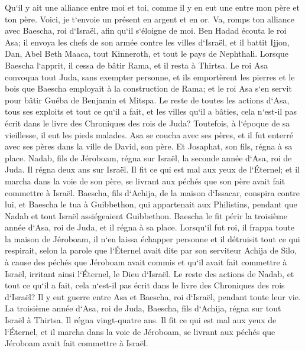 \verse Qu`il y ait une alliance entre moi et toi, comme il y en eut une entre mon père et ton père. Voici, je t`envoie un présent en argent et en or. Va, romps ton alliance avec Baescha, roi d`Israël, afin qu`il s`éloigne de moi. 
\verse Ben Hadad écouta le roi Asa; il envoya les chefs de son armée contre les villes d`Israël, et il battit Ijjon, Dan, Abel Beth Maaca, tout Kinneroth, et tout le pays de Nephthali. 
\verse Lorsque Baescha l`apprit, il cessa de bâtir Rama, et il resta à Thirtsa. 
\verse Le roi Asa convoqua tout Juda, sans exempter personne, et ils emportèrent les pierres et le bois que Baescha employait à la construction de Rama; et le roi Asa s`en servit pour bâtir Guéba de Benjamin et Mitspa. 
\verse Le reste de toutes les actions d`Asa, tous ses exploits et tout ce qu`il a fait, et les villes qu`il a bâties, cela n`est-il pas écrit dans le livre des Chroniques des rois de Juda? Toutefois, à l`époque de sa vieillesse, il eut les pieds malades. 
\verse Asa se coucha avec ses pères, et il fut enterré avec ses pères dans la ville de David, son père. Et Josaphat, son fils, régna à sa place. 
\verse Nadab, fils de Jéroboam, régna sur Israël, la seconde année d`Asa, roi de Juda. Il régna deux ans sur Israël. 
\verse Il fit ce qui est mal aux yeux de l`Éternel; et il marcha dans la voie de son père, se livrant aux péchés que son père avait fait commettre à Israël. 
\verse Baescha, fils d`Achija, de la maison d`Issacar, conspira contre lui, et Baescha le tua à Guibbethon, qui appartenait aux Philistins, pendant que Nadab et tout Israël assiégeaient Guibbethon. 
\verse Baescha le fit périr la troisième année d`Asa, roi de Juda, et il régna à sa place. 
\verse Lorsqu`il fut roi, il frappa toute la maison de Jéroboam, il n`en laissa échapper personne et il détruisit tout ce qui respirait, selon la parole que l`Éternel avait dite par son serviteur Achija de Silo, 
\verse à cause des péchés que Jéroboam avait commis et qu`il avait fait commettre à Israël, irritant ainsi l`Éternel, le Dieu d`Israël. 
\verse Le reste des actions de Nadab, et tout ce qu`il a fait, cela n`est-il pas écrit dans le livre des Chroniques des rois d`Israël? 
\verse Il y eut guerre entre Asa et Baescha, roi d`Israël, pendant toute leur vie. 
\verse La troisième année d`Asa, roi de Juda, Baescha, fils d`Achija, régna sur tout Israël à Thirtsa. Il régna vingt-quatre ans. 
\verse Il fit ce qui est mal aux yeux de l`Éternel, et il marcha dans la voie de Jéroboam, se livrant aux péchés que Jéroboam avait fait commettre à Israël. 

\chapter{}

